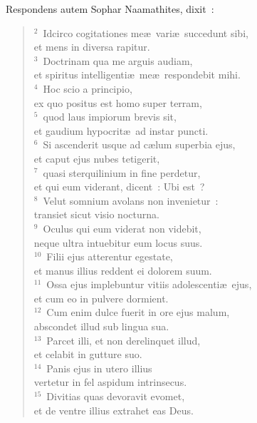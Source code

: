 \lettrine[lines=10,image=true,loversize=0.05,lraise=-0.03]{R}{}espondens autem Sophar Naamathites, dixit~:
\begin{flushleft}\begin{verse}\vspace{6pt}${}^{2}$~Idcirco cogitationes me\ae\ vari\ae\ succedunt sibi,\\ et mens in diversa rapitur.\\
${}^{3}$~Doctrinam qua me arguis audiam,\\ et spiritus intelligenti\ae\ me\ae\ respondebit mihi.\\
${}^{4}$~Hoc scio a principio,\\ ex quo positus est homo super terram,\\
${}^{5}$~quod laus impiorum brevis sit,\\ et gaudium hypocrit\ae\ ad instar puncti.\\
${}^{6}$~Si ascenderit usque ad c\ae lum superbia ejus,\\ et caput ejus nubes tetigerit,\\
${}^{7}$~quasi sterquilinium in fine perdetur,\\ et qui eum viderant, dicent~: Ubi est~?\\
${}^{8}$~Velut somnium avolans non invenietur~:\\ transiet sicut visio nocturna.\\
${}^{9}$~Oculus qui eum viderat non videbit,\\ neque ultra intuebitur eum locus suus.\\
${}^{10}$~Filii ejus atterentur egestate,\\ et manus illius reddent ei dolorem suum.\\
${}^{11}$~Ossa ejus implebuntur vitiis adolescenti\ae\ ejus,\\ et cum eo in pulvere dormient.\\
${}^{12}$~Cum enim dulce fuerit in ore ejus malum,\\ abscondet illud sub lingua sua.\\
${}^{13}$~Parcet illi, et non derelinquet illud,\\ et celabit in gutture suo.\\
${}^{14}$~Panis ejus in utero illius\\ vertetur in fel aspidum intrinsecus.\\
${}^{15}$~Divitias quas devoravit evomet,\\ et de ventre illius extrahet eas Deus.\\

\end{verse}
\end{flushleft}
